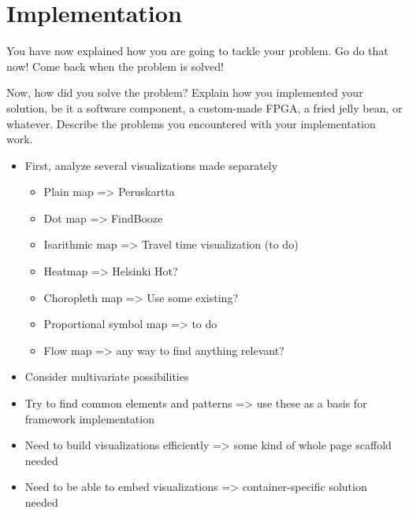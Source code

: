 
\chapter{Implementation}
\label{chapter:implementation}


You have now explained how you are going to tackle your problem. 
Go do that now! Come back when the problem is solved!

Now, how did you solve the problem? 
Explain how you implemented your solution, be it a software component, a
custom-made FPGA, a fried jelly bean, or whatever.
Describe the problems you encountered with your implementation work.


\begin{itemize}
	\item First, analyze several visualizations made separately
	\begin{itemize}
		\item Plain map => Peruskartta
		\item Dot map => FindBooze
		\item Isarithmic map => Travel time visualization (to do)
		\item Heatmap => Helsinki Hot?
		\item Choropleth map => Use some existing?
		\item Proportional symbol map => to do
		\item Flow map => any way to find anything relevant?
	\end{itemize}
	\item Consider multivariate possibilities
	\item Try to find common elements and patterns => use these as a basis for framework implementation
	\item Need to build visualizations efficiently => some kind of whole page scaffold needed
	\item Need to be able to embed visualizations => container-specific solution needed
\end{itemize}
